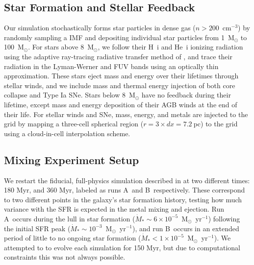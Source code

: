 \documentclass[twocolumn]{aastex62}
\newcommand{\runonenu}{A}
\newcommand{\runtwonu}{B}
\begin{document}
\subsection{Star Formation and Stellar Feedback}
Our simulation stochastically forms star particles in dense gas ($n > 200$~cm$^{-3}$) by randomly sampling a \cite{Salpeter1955} IMF and depositing individual star particles from 1~M$_{\odot}$ to 100~M$_{\odot}$. For stars above 8~M$_{\odot}$, we follow their H~{\sc i} and He~{\sc i} ionizing radiation using the adaptive ray-tracing radiative transfer method of \cite{WiseAbel2011}, and trace their radiation in the Lyman-Werner and FUV bands using an optically thin approximation. These stars eject mass and energy over their lifetimes through stellar winds, and we include mass and thermal energy injection of both core collapse and Type Ia SNe. Stars below 8~M$_{\odot}$ have no feedback during their lifetime, except mass and energy deposition of their AGB winds at the end of their life. For stellar winds and SNe, mass, energy, and metals are injected to the grid by mapping a three-cell spherical region ($r=3 \times dx = 7.2~$pc) to the grid using a cloud-in-cell interpolation scheme. 

\subsection{Mixing Experiment Setup}
\label{sec:experiment}
We restart the fiducial, full-physics simulation described in \cite{Emerick2019} at two different times: 180 Myr, and 360 Myr, labeled as runs \runonenu~and \runtwonu~respectively. These correspond to two different points in the galaxy's star formation history, testing how much variance with the SFR is expected in the metal mixing and ejection. Run \runonenu~occurs during the lull in star formation ($\dot{M}_{*} \sim 6 \times 10^{-5}$~M$_{\odot}$~yr$^{-1}$) following the initial SFR peak ($\dot{M}_{*} \sim 10^{-3}$~M$_{\odot}$~yr$^{-1}$), and run \runtwonu~occurs in an extended period of little to no ongoing star formation ($\dot{M}_{*} < 1 \times 10^{-5}$~M$_{\odot}$~yr$^{-1}$). We attempted to to evolve each simulation for 150 Myr, but due to computational constraints this was not always possible.

\end{document}
